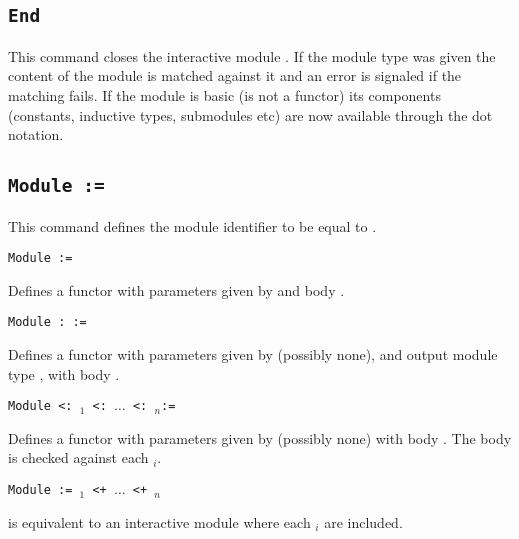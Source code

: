\subsection{\tt End {\ident}
}

This command closes the interactive module {\ident}. If the module type
was given the content of the module is matched against it and an error
is signaled if the matching fails. If the module is basic (is not a
functor) its components (constants, inductive types, submodules etc) are
now available through the dot notation.

\begin{ErrMsgs}
\item {}
\item {}
\item {}
\end{ErrMsgs}


\subsection{\tt Module {\ident} := {\modexpr}
}

This command defines the module identifier {\ident} to be equal to
{\modexpr}.

\begin{Variants}
\item{\tt Module {\ident} {\modbindings} := {\modexpr}}

 Defines a functor with parameters given by {\modbindings} and body {\modexpr}.

%
%

\item{\tt Module {\ident} {\modbindings} \verb.:. {\modtype} :=
    {\modexpr}}

  Defines a functor with parameters given by {\modbindings} (possibly none),
  and output module type {\modtype}, with body {\modexpr}.

\item{\tt Module {\ident} {\modbindings} \verb.<:.  {\modtype$_1$} \verb.<:. $\ldots$ \verb.<:. {\modtype$_n$}:=
    {\modexpr}}

  Defines a functor with parameters given by {\modbindings} (possibly none)
  with body {\modexpr}. The body is checked against each {\modtype$_i$}.

\item{\tt Module {\ident} {\modbindings} := {\modexpr$_1$} \verb.<+. $\ldots$ \verb.<+. {\modexpr$_n$}}

  is equivalent to an interactive module where each {\modexpr$_i$} are included.

\end{Variants}

